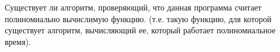 Существует ли алгоритм, проверяющий, что данная программа считает полиномиально вычислимую функцию. (т.е. такую функцию, для
которой существует алгоритм, вычисляющий ее, который работает полиномиальное время).
